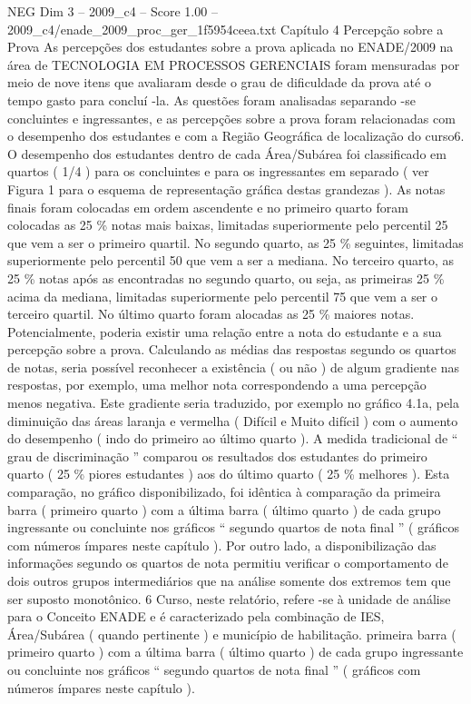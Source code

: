 \begin{textsample}{NEG Dim 3 – 2009\_c4 – Score 1.00 – 2009\_c4/enade\_2009\_proc\_ger\_1f5954ceea.txt}  \label{ex:f3_neg_160}
Capítulo 4 Percepção sobre a Prova As percepções dos estudantes sobre a prova aplicada no ENADE/2009 na área de TECNOLOGIA EM PROCESSOS GERENCIAIS foram mensuradas por meio de nove itens que avaliaram desde o grau de dificuldade da prova até o tempo gasto para concluí -la.
As questões foram analisadas separando -se concluintes e ingressantes, e as percepções sobre a prova foram relacionadas com o desempenho dos estudantes e com a Região Geográfica de localização do curso6.
O desempenho dos estudantes dentro de cada Área/Subárea foi classificado em quartos ( 1/4 ) para os concluintes e para os ingressantes em separado ( ver Figura 1 para o esquema de representação gráfica destas grandezas ).
As notas finais foram colocadas em ordem ascendente e no primeiro quarto foram colocadas as 25 \% notas mais baixas, limitadas superiormente pelo percentil 25 que vem a ser o primeiro quartil.
No segundo quarto, as 25 \% seguintes, limitadas superiormente pelo percentil 50 que vem a ser a mediana.
No terceiro quarto, as 25 \% notas após as encontradas no segundo quarto, ou seja, as primeiras 25 \% acima da mediana, limitadas superiormente pelo percentil 75 que vem a ser o terceiro quartil.
No último quarto foram alocadas as 25 \% maiores notas.
Potencialmente, poderia existir uma relação entre a nota do estudante e a sua percepção sobre a prova.
Calculando as médias das respostas segundo os quartos de notas, seria possível reconhecer a existência ( ou não ) de algum gradiente nas respostas, por exemplo, uma melhor nota correspondendo a uma percepção menos negativa.
Este gradiente seria traduzido, por exemplo no gráfico 4.1a, pela diminuição das áreas laranja e vermelha ( Difícil e Muito difícil ) com o aumento do desempenho ( indo do primeiro ao último quarto ).
A medida tradicional de “ grau de discriminação ” comparou os resultados dos estudantes do primeiro quarto ( 25 \% piores estudantes ) aos do último quarto ( 25 \% melhores ).
Esta comparação, no gráfico disponibilizado, foi idêntica à comparação da primeira barra ( primeiro quarto ) com a última barra ( último quarto ) de cada grupo ingressante ou concluinte nos gráficos “ segundo quartos de nota final ” ( gráficos com números ímpares neste capítulo ).
Por outro lado, a disponibilização das informações segundo os quartos de nota permitiu verificar o comportamento de dois outros grupos intermediários que na análise somente dos extremos tem que ser suposto monotônico. 6 Curso, neste relatório, refere -se à unidade de análise para o Conceito ENADE e é caracterizado pela combinação de IES, Área/Subárea ( quando pertinente ) e município de habilitação. primeira barra ( primeiro quarto ) com a última barra ( último quarto ) de cada grupo ingressante ou concluinte nos gráficos “ segundo quartos de nota final ” ( gráficos com números ímpares neste capítulo ).

\end{textsample}

